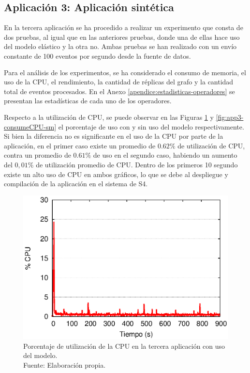 \subsection{Aplicaci\'on 3: Aplicaci\'on sint\'etica}
En la tercera aplicaci\'on se ha procedido a realizar un experimento que consta de dos pruebas, al igual que en las anteriores pruebas, donde una de ellas hace uso del modelo el\'astico y la otra no. Ambas pruebas se han realizado con un env\'io constante de 100 eventos por segundo desde la fuente de datos.

Para el an\'alisis de los experimentos, se ha considerado el consumo de memoria, el uso de la CPU, \normalsize{el rendimiento, la cantidad de r\'eplicas del grafo} y la cantidad total de eventos procesados. En el Anexo \ref{apendice:estadisticas-operadores} \normalsize{se presentan las estad\'isticas de cada uno de los operadores.}


Respecto a la utilizaci\'on de CPU, se puede observar en las Figuras \ref{fig:app3-consumeCPU-cm} y \ref{fig:app3-consumeCPU-sm} el porcentaje de uso con y sin uso del modelo respectivamente. Si bien la diferencia no es significante en el uso de la CPU por parte de la aplicaci\'on, en el primer caso existe un promedio de $0.62\%$ de utilizaci\'on de CPU, contra un promedio de $0.61\%$ de uso en el segundo caso, habiendo un aumento del $0,01\%$ de utilizaci\'on promedio de CPU. Dentro de los primeros 10 segundo existe un alto uso de CPU en ambos gr\'aficos, lo que se debe al despliegue y compilaci\'on de la aplicaci\'on en el sistema de S4.

\begin{figure}[!ht]
	\centering
	\captionsetup{justification=centering}
    \includegraphics[scale=0.65]{images/exp/app3/cm/fisical/consumeCPU.eps}
    \caption[Porcentaje de utilizaci\'on de la CPU en la tercera aplicaci\'on con uso del modelo.]{Porcentaje de utilizaci\'on de la CPU en la tercera aplicaci\'on con uso del modelo.\\Fuente: Elaboraci\'on propia.}
    \label{fig:app3-consumeCPU-cm}
\end{figure}

